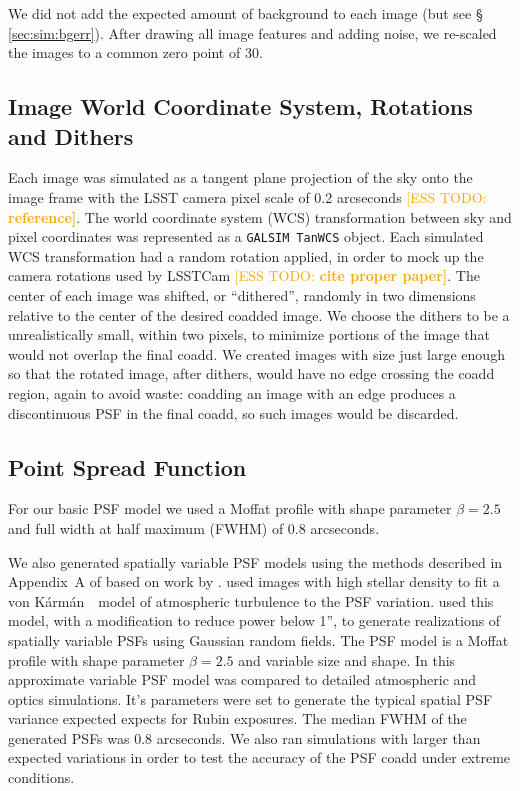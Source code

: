 \documentclass[twocolumn,twocolappendix,astrosym]{openjournal}
\newcommand{\esstodo}[1]{\textcolor{orange}{[ESS TODO: \bf #1]}}
\newcommand{\galsim}{\texttt{GALSIM}}
\newcommand{\vonkarman}{{von K\'arm\'an}~}
\begin{document}
We did not add the expected amount of background to each image (but see \S
\ref{sec:sim:bgerr}).  After drawing all image features and adding
noise, we re-scaled the images to a common zero point of 30.

\subsection{Image World Coordinate System, Rotations and Dithers} \label{sec:sim:rotdith}

Each image was simulated as a tangent plane projection of the sky onto the
image frame with the LSST camera pixel scale of 0.2 arcseconds \esstodo{reference}.
The world coordinate system (WCS) transformation between sky and pixel
coordinates was represented as a \galsim\ \texttt{TanWCS} object.  Each
simulated WCS transformation had a random rotation applied, in order to mock up
the camera rotations used by LSSTCam \esstodo{cite proper paper}.  The center of
each image was shifted, or ``dithered'', randomly in two dimensions relative to
the center of the desired coadded image.  We choose the dithers to be a
unrealistically small, within two pixels, to minimize portions of the image
that would not overlap the final coadd.  We created images with size just large enough
so that the rotated image, after dithers, would have no edge crossing the coadd
region, again to avoid waste:  coadding an image with an edge produces a
discontinuous PSF in the final coadd, so such images would be discarded.

\subsection{Point Spread Function} \label{sec:sim:psfs}

For our basic PSF model we used a Moffat profile \citep{Moffat1969} with
shape parameter $\beta=2.5$ and full width at half maximum (FWHM) of 0.8 arcseconds.

We also generated spatially variable PSF models using the methods described in
Appendix~A of \citet{mdet20} based on work by \citet{heymans2012}.
\citet{heymans2012} used images with high stellar density to fit a \vonkarman\
model of atmospheric turbulence to the PSF variation. \citet{mdet20}
used this model, with a modification to reduce power below 1'', to generate
realizations of spatially variable PSFs using Gaussian random fields. The PSF
model is a Moffat \citep{Moffat1969} profile with shape parameter $\beta=2.5$
and variable size and shape. In \citet{mdet20} this approximate
variable PSF model was compared to detailed atmospheric and optics simulations.
It's parameters were set to generate the typical spatial PSF variance expected
expects for Rubin exposures. The median FWHM of the generated PSFs was 0.8
arcseconds.  We also ran simulations with larger than expected variations in
order to test the accuracy of the PSF coadd under extreme conditions.
\end{document}
